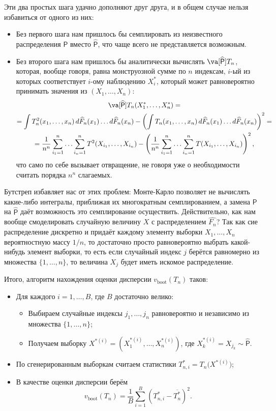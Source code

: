 Эти два простых шага удачно дополняют друг друга, и в общем случае нельзя избавиться от одного из них:
\begin{itemize}
    \item Без первого шага нам пришлось бы семплировать из неизвестного распределения $\mathsf{P}$ вместо $\widehat{\mathsf{P}}$, что чаще всего не представляется возможным.
    \item Без второго шага нам пришлось бы аналитически вычислять $\va[\widehat{\mathsf{P}}] T_n$, которая, вообще говоря, равна монструозной сумме по $n$ индексам, $i$-ый из которых соответствует $i$-ому наблюдению $X_i^*$, который может равновероятно принимать значения из $(X_1, \ldots, X_n)$:
    \begin{gather*}
        \va[\widehat{\mathsf{P}}] T_n(X_1^*, \ldots, X_n^*) = \\
        = \int T_n^2(x_1, \ldots, x_n)\,d\widehat F_n(x_1)\ldots d\widehat F_n(x_n) - \left(\int T_n(x_1, \ldots, x_n)\,d\widehat F_n(x_1)\ldots d\widehat F_n(x_n)\right)^2 = \\
        = \frac{1}{n^n} \sum_{i_1=1}^n \ldots \sum_{i_n=1}^n T^2(X_{i_1}, \ldots, X_{i_n}) - \left(\frac{1}{n^n} \sum_{i_1=1}^n \ldots \sum_{i_n=1}^n T(X_{i_1}, \ldots, X_{i_n})\right)^2,
    \end{gather*}
    что само по себе вызывает отвращение, не говоря уже о необходимости считать порядка $n^n$ слагаемых.
\end{itemize}

Бутстреп избавляет нас от этих проблем: Монте-Карло позволяет не вычислять какие-либо интегралы, приближая их многократным семплированием, а замена $\mathsf{P}$ на $\widehat{\mathsf{P}}$ даёт возможность это семплирование осуществить. Действительно, как нам вообще смоделировать случайную величину $X$ с распределением $\widehat{F_n}$? Так как сие распределение дискретно и придаёт каждому элементу выборки $X_1, \ldots, X_n$ вероятностную массу $1/n$, то достаточно просто равновероятно выбрать какой-нибудь элемент выборки, то есть если случайный индекс $j$ берётся равномерно из множества $\{1, \ldots, n\}$, то величина $X_j$ будет иметь искомое распределение. 

Итого, алгоритм нахождения оценки дисперсии $v_{\text{boot}}(T_n)$ таков:
\begin{itemize}
    \item Для каждого $i = 1,\ldots, B$, где $B$ достаточно велико:
    \begin{itemize}
        \item Выбираем случайные индексы $j_1, \ldots, j_n$ равновероятно и независимо из множества $\{1, \ldots, n\}$;
        \item Получаем выборку $X^{*(i)} = (X_1^{*(i)}, \ldots, X_n^{*(i)})$, где $X_k^{*(i)} = X_{j_k} \sim \widehat{\mathsf{P}}$.
    \end{itemize}
    \item По сгенерированным выборкам считаем статистики $T_{n, i}^* = T_{n}\bigl(X^{*(i)}\bigr)$;
    \item В качестве оценки дисперсии берём
    \[
        v_{\text{boot}}(T_n) = \frac{1}{B} \sum_{i=1}^B \left(T_{n, i}^* - \overline{T_n^*}\right)^2.
    \]
\end{itemize}

